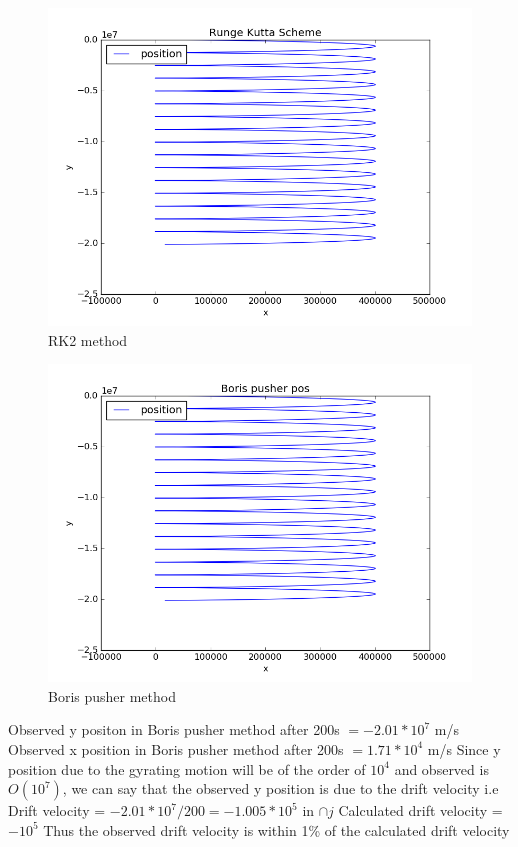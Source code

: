 \documentclass[11pt, a4paper]{article}
\begin{document}
\begin{figure}[H]
 \centering
 \includegraphics[scale = 0.5]{RK2_pos_2.png}
 \caption{RK2 method}
\end{figure}
\begin{figure}[H]
 \centering
 \includegraphics[scale = 0.5]{Boris_pos_2.png}
 \caption{Boris pusher method}
\end{figure}

Observed y positon in Boris pusher method after 200s $=-2.01*10^7$ m/s
Observed x position in Boris pusher method after 200s $=1.71*10^4$ m/s
Since y position due to the gyrating motion will be of the order of $10^4$ and observed is $O(10^7)$, we can say that the 
observed y position is due to the drift velocity
i.e Drift velocity = $-2.01*10^7/200 = -1.005*10^5$ in $\cap{j}$
Calculated drift velocity = $-10^5$
Thus the observed drift velocity is within 1\% of the calculated drift velocity
\end{document}
